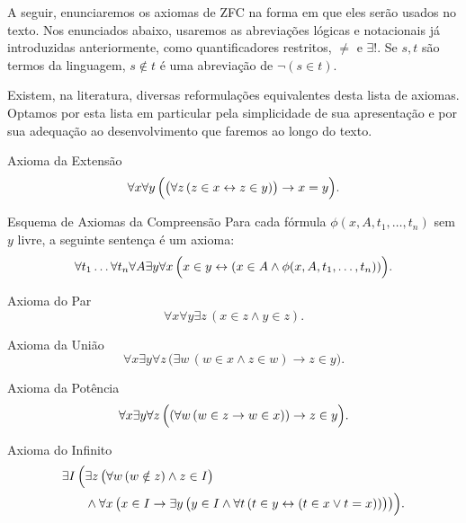 A seguir, enunciaremos os axiomas de ZFC na forma em que eles serão usados no texto.
Nos enunciados abaixo, usaremos as abreviações lógicas e notacionais já introduzidas anteriormente,
como quantificadores restritos, $\neq$ e $\exists!$.
Se $s, t$ são termos da linguagem, $s \notin t$ é uma abreviação de $\neg (s \in t)$.

Existem, na literatura, diversas reformulações equivalentes desta lista de axiomas.
Optamos por esta lista em particular pela simplicidade de sua apresentação e por sua adequação ao desenvolvimento que faremos ao longo do texto.

\begin{displayaxiom}{Axioma da Extensão}
    \[
        \forall x \forall y\, \Bigl(\bigl(\forall z\, (z \in x \leftrightarrow z \in y)\bigr) \rightarrow x = y\Bigr).
    \]
\end{displayaxiom}

\begin{displayaxiom}{Esquema de Axiomas da Compreensão}
    Para cada fórmula $\phi(x, A, t_1, \ldots, t_n)$ sem $y$ livre, a seguinte sentença é um axioma:
    \[
        \forall t_1 \ldots \forall t_n \forall A \exists y \forall x\, \Bigl(x \in y \leftrightarrow (x \in A \land \phi(x, A, t_1, \ldots, t_n))\Bigr).
    \]
\end{displayaxiom}

\begin{displayaxiom}{Axioma do Par}
    \[
        \forall x \forall y \exists z\, (x \in z \land y \in z).
    \]
\end{displayaxiom}

\begin{displayaxiom}{Axioma da União}
    \[
        \forall x \exists y \forall z\, \bigl(\exists w\, (w \in x \land z \in w) \rightarrow z \in y\bigr).
    \]
\end{displayaxiom}

\begin{displayaxiom}{Axioma da Potência}
    \[
        \forall x \exists y \forall z\, \Bigl((\forall w\, (w \in z \rightarrow w \in x)) \rightarrow z \in y\Bigr).
    \]
\end{displayaxiom}

\begin{displayaxiom}{Axioma do Infinito}
    \[
        \begin{aligned}
            \exists I\, \Bigl(
                &\exists z\, \bigl(\forall w\, (w \notin z) \land z \in I\bigr) \\
                &\land \forall x\, \bigl(
                    x \in I
                    \rightarrow
                    \exists y\, \bigl(
                        y \in I
                        \land
                        \forall t\, (t \in y \leftrightarrow (t \in x \lor t = x))
                    \bigr)
                \bigr)
            \Bigr).
        \end{aligned}
    \]
\end{displayaxiom}

